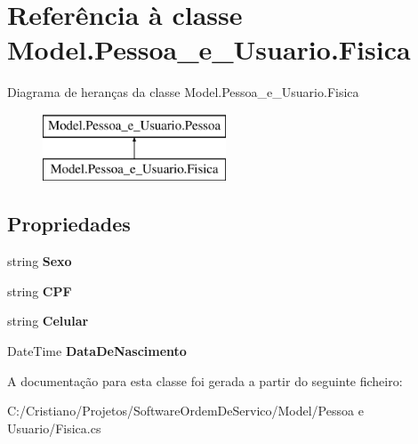 \hypertarget{class_model_1_1_pessoa__e___usuario_1_1_fisica}{}\section{Referência à classe Model.\+Pessoa\+\_\+e\+\_\+\+Usuario.\+Fisica}
\label{class_model_1_1_pessoa__e___usuario_1_1_fisica}
Diagrama de heranças da classe Model.\+Pessoa\+\_\+e\+\_\+\+Usuario.\+Fisica\begin{figure}[H]
\begin{center}
\leavevmode
\includegraphics[height=2.000000cm]{class_model_1_1_pessoa__e___usuario_1_1_fisica}
\end{center}
\end{figure}
\subsection*{Propriedades}
\begin{DoxyCompactItemize}
\item 
\hypertarget{class_model_1_1_pessoa__e___usuario_1_1_fisica_a29515077dfb355670b8c0a7d7ebe994b}{}string {\bfseries Sexo}\label{class_model_1_1_pessoa__e___usuario_1_1_fisica_a29515077dfb355670b8c0a7d7ebe994b}

\item 
\hypertarget{class_model_1_1_pessoa__e___usuario_1_1_fisica_a2baa5ada8c7dd8be142e08abd58b21c3}{}string {\bfseries C\+P\+F}\label{class_model_1_1_pessoa__e___usuario_1_1_fisica_a2baa5ada8c7dd8be142e08abd58b21c3}

\item 
\hypertarget{class_model_1_1_pessoa__e___usuario_1_1_fisica_ac87cd88aaa7c64a5208f9aa25b4f7cf8}{}string {\bfseries Celular}\label{class_model_1_1_pessoa__e___usuario_1_1_fisica_ac87cd88aaa7c64a5208f9aa25b4f7cf8}

\item 
\hypertarget{class_model_1_1_pessoa__e___usuario_1_1_fisica_afa181c961f544f9da0e9bd76a6f7dc1b}{}Date\+Time {\bfseries Data\+De\+Nascimento}\label{class_model_1_1_pessoa__e___usuario_1_1_fisica_afa181c961f544f9da0e9bd76a6f7dc1b}

\end{DoxyCompactItemize}


A documentação para esta classe foi gerada a partir do seguinte ficheiro\+:\begin{DoxyCompactItemize}
\item 
C\+:/\+Cristiano/\+Projetos/\+Software\+Ordem\+De\+Servico/\+Model/\+Pessoa e Usuario/Fisica.\+cs\end{DoxyCompactItemize}
